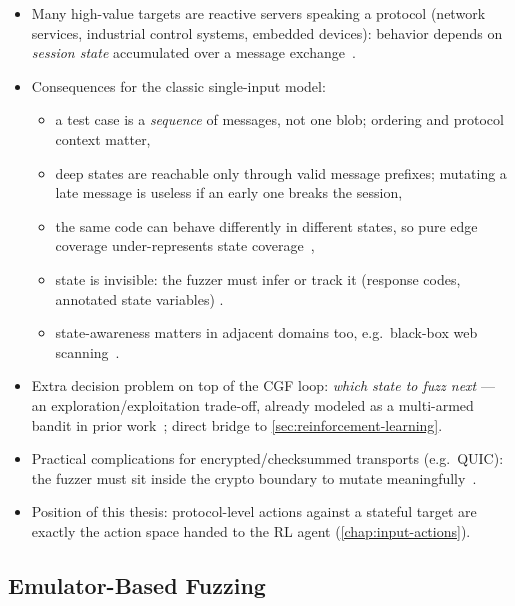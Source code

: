 \begin{itemize}
  \item Many high-value targets are reactive servers speaking a protocol (network services,
    industrial control systems, embedded devices): behavior depends on \emph{session state}
    accumulated over a message exchange~\cite{ang_quic-fuzz_2025,borcherding_bandits_2023}.
  \item Consequences for the classic single-input model:
    \begin{itemize}
      \item a test case is a \emph{sequence} of messages, not one blob; ordering and protocol
        context matter,
      \item deep states are reachable only through valid message prefixes; mutating a late message
        is useless if an early one breaks the session,
      \item the same code can behave differently in different states, so pure edge coverage
        under-represents state coverage~\cite{borcherding_bandits_2023},
      \item state is invisible: the fuzzer must infer or track it (response codes, annotated state
        variables) .
      \item state-awareness matters in adjacent domains too, e.g.\ black-box web
        scanning~\cite{doupe_enemy_2012}.
    \end{itemize}
  \item Extra decision problem on top of the CGF loop: \emph{which state to fuzz next} ---
    an exploration/exploitation trade-off, already modeled as a multi-armed bandit in prior
    work~\cite{borcherding_bandits_2023}; direct bridge to \cref{sec:reinforcement-learning}.
  \item Practical complications for encrypted/checksummed transports (e.g.\ QUIC): the fuzzer must
    sit inside the crypto boundary to mutate meaningfully~\cite{ang_quic-fuzz_2025}.
  \item Position of this thesis: protocol-level actions against a stateful target are exactly the
    action space handed to the RL agent (\cref{chap:input-actions}).
\end{itemize}

\subsection{Emulator-Based Fuzzing}\label{sec:fuzzing-emulation}

